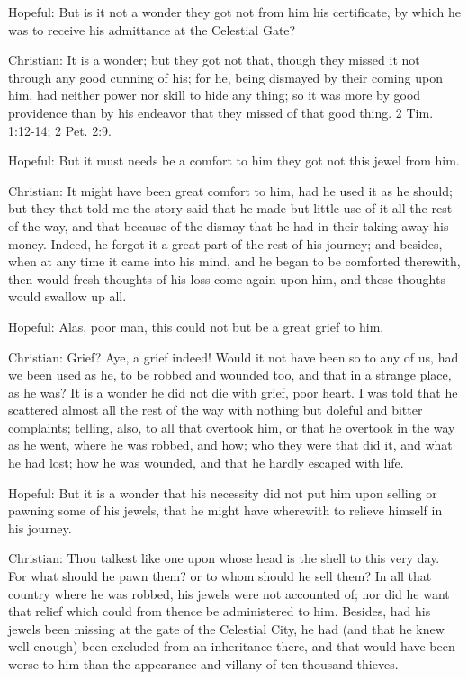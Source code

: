 Hopeful: But is it not a wonder they got not from him his certificate, by which he was to receive his admittance at the Celestial Gate?

Christian: It is a wonder; but they got not that, though they missed it not through any good cunning of his; for he, being dismayed by their coming upon him, had neither power nor skill to hide any thing; so it was more by good providence than by his endeavor that they missed of that good thing. 2 Tim. 1:12-14; 2 Pet. 2:9.

Hopeful: But it must needs be a comfort to him they got not this jewel from him.

Christian: It might have been great comfort to him, had he used it as he should; but they that told me the story said that he made but little use of it all the rest of the way, and that because of the dismay that he had in their taking away his money. Indeed, he forgot it a great part of the rest of his journey; and besides, when at any time it came into his mind, and he began to be comforted therewith, then would fresh thoughts of his loss come again upon him, and these thoughts would swallow up all.

Hopeful: Alas, poor man, this could not but be a great grief to him.

Christian: Grief? Aye, a grief indeed! Would it not have been so to any of us, had we been used as he, to be robbed and wounded too, and that in a strange place, as he was? It is a wonder he did not die with grief, poor heart. I was told that he scattered almost all the rest of the way with nothing but doleful and bitter complaints; telling, also, to all that overtook him, or that he overtook in the way as he went, where he was robbed, and how; who they were that did it, and what he had lost; how he was wounded, and that he hardly escaped with life.

Hopeful: But it is a wonder that his necessity did not put him upon selling or pawning some of his jewels, that he might have wherewith to relieve himself in his journey.

Christian: Thou talkest like one upon whose head is the shell to this very day. For what should he pawn them? or to whom should he sell them? In all that country where he was robbed, his jewels were not accounted of; nor did he want that relief which could from thence be administered to him. Besides, had his jewels been missing at the gate of the Celestial City, he had (and that he knew well enough) been excluded from an inheritance there, and that would have been worse to him than the appearance and villany of ten thousand thieves.

